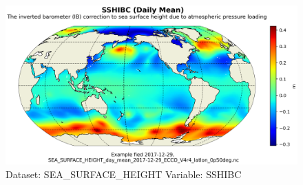 \begin{figure}[H]
\centering
\includegraphics[scale=0.55]{../images/plots/latlon_plots/Sea_Surface_Height/SSHIBC.png}
\caption{Dataset: SEA\_SURFACE\_HEIGHT Variable: SSHIBC}
\label{tab:table-SEA_SURFACE_HEIGHT_SSHIBC-Plot}
\end{figure}
\pagebreak
